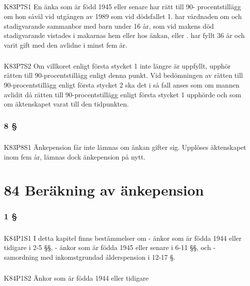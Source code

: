 \documentclass[a4paper,notitlepage,openany,10pt]{book}
\begin{document}
\paragraph*{}
{\tiny K83P7S1}
En änka som är född 1945 eller senare har rätt till 90- procentstillägg om hon såväl vid utgången av 1989 som vid dödsfallet 1. har vårdnaden om och stadigvarande sammanbor med barn under 16 år, som vid makens död stadigvarande vistades i makarnas hem eller hos änkan, eller
. har fyllt 36 år och varit gift med den avlidne i minst fem år.
\paragraph*{}
{\tiny K83P7S2}
Om villkoret enligt första stycket 1 inte längre är uppfyllt, upphör rätten till 90-procentstillägg enligt denna punkt. Vid bedömningen av rätten till 90-procentstillägg enligt första stycket 2 ska det i så fall anses som om mannen avlidit då rätten till 90-procentstillägg enligt första stycket 1 upphörde och som om äktenskapet varat till den tidpunkten.
\subsection*{8 §}
\paragraph*{}
{\tiny K83P8S1}
Änkepension får inte lämnas om änkan gifter sig. Upplöses äktenskapet inom fem år, lämnas dock änkepension på nytt.
\chapter*{84 Beräkning av änkepension}
\subsection*{1 §}
\paragraph*{}
{\tiny K84P1S1}
I detta kapitel finns bestämmelser om
\newline - änkor som är födda 1944 eller tidigare i 2-5 §§,
\newline - änkor som är födda 1945 eller senare i 6-11 §§, och
\newline - samordning med inkomstgrundad ålderspension i 12-17 §.
\paragraph*{}
{\tiny K84P1S2}
Änkor som är födda 1944 eller tidigare
\end{document}
